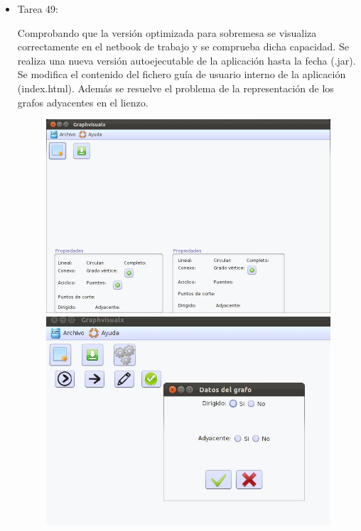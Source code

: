 \begin{itemize}
\item Tarea 49:

Comprobando que la versión optimizada para sobremesa se visualiza correctamente en el netbook de trabajo y se comprueba dicha capacidad. Se realiza una nueva versión autoejecutable de la aplicación hasta la fecha (.jar). Se modifica el contenido del fichero guía de usuario interno de la aplicación (index.html). Además se resuelve el problema de la representación de los grafos adyacentes en el lienzo.
\newpage
\begin{figure}[H]
\begin{center}
\includegraphics[width=14cm]{./imagenes_documentacion/Graphvisualx_14_11_2011/captura_1.jpeg}
\includegraphics[width=14cm]{./imagenes_documentacion/Graphvisualx_14_11_2011/captura_2.jpeg}
\end{center}

\end{figure}
\end{itemize}

